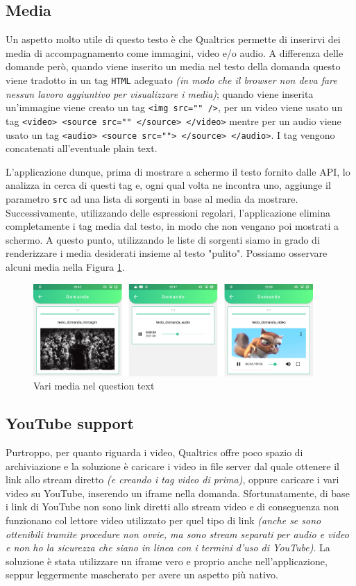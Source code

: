 \subsection{Media}
Un aspetto molto utile di questo testo è che Qualtrics permette di inserirvi dei media di accompagnamento come immagini, video e/o audio. A differenza delle domande però, quando viene inserito un media nel testo della domanda questo viene tradotto in un tag \texttt{HTML} adeguato \textit{(in modo che il browser non deva fare nessun lavoro aggiuntivo per visualizzare i media)}; quando viene inserita un'immagine viene creato un tag \texttt{<img src="" />}, per un video viene usato un tag \texttt{<video> <source src="" </source> </video>} mentre per un audio viene usato un tag \texttt{<audio> <source src=""> </source> </audio>}. I tag vengono concatenati all'eventuale plain text.

L'applicazione dunque, prima di mostrare a schermo il testo fornito dalle API, lo analizza in cerca di questi tag e, ogni qual volta ne incontra uno, aggiunge il parametro \texttt{src} ad una lista di sorgenti in base al media da mostrare. Successivamente, utilizzando delle espressioni regolari, l'applicazione elimina completamente i tag media dal testo, in modo che non vengano poi mostrati a schermo. A questo punto, utilizzando le liste di sorgenti siamo in grado di renderizzare i media desiderati insieme al testo "pulito". Possiamo osservare alcuni media nella Figura \ref{fig:media_vari}.

\begin{figure}[h!]
\centering
\includegraphics[width=0.95\textwidth]{img/media_vari}
\caption{Vari media nel question text}
\label{fig:media_vari}
\end{figure}

\subsection{YouTube support}
Purtroppo, per quanto riguarda i video, Qualtrics offre poco spazio di archiviazione e la soluzione è caricare i video in file server dal quale ottenere il link allo stream diretto \textit{(e creando i tag video di prima)}, oppure caricare i vari video su YouTube, inserendo un iframe nella domanda. Sfortunatamente, di base i link di YouTube non sono link diretti allo stream video e di conseguenza non funzionano col lettore video utilizzato per quel tipo di link \textit{(anche se sono ottenibili tramite procedure non ovvie, ma sono stream separati per audio e video e non ho la sicurezza che siano in linea con i termini d'uso di YouTube)}. La soluzione è stata utilizzare un iframe vero e proprio anche nell'applicazione, seppur leggermente mascherato per avere un aspetto più nativo.

